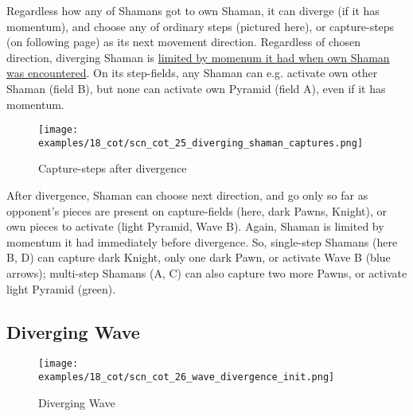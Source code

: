 \vspace*{-0.4\baselineskip}
Regardless how any of Shamans got to own Shaman, it can diverge (if it has momentum),
and choose any of ordinary steps (pictured here), or capture-steps (on following page)
as its next movement direction. Regardless of chosen direction, diverging Shaman is
\hyperref[fig:scn_cot_10_own_shaman_is_divergent_end]{limited by momenum it had when own Shaman was encountered}. \newline
\indent
On its step-fields, any Shaman can e.g. activate own other Shaman (field B), but none
can activate own Pyramid (field A), even if it has momentum.

\clearpage %

\vspace*{-2.1\baselineskip}
\noindent
\begin{figure}[!h]
\texttt{[image: examples/18\_cot/scn\_cot\_25\_diverging\_shaman\_captures.png]}
\vspace*{-1.3\baselineskip}
\caption{Capture-steps after divergence}
\label{fig:scn_cot_25_diverging_shaman_captures}
\end{figure}

\vspace*{-0.4\baselineskip}
After divergence, Shaman can choose next direction, and go only so far as opponent's
pieces are present on capture-fields (here, dark Pawns, Knight), or own pieces to
activate (light Pyramid, Wave B).  \newline
\indent
Again, Shaman is limited by momentum it had immediately before divergence. So,
single-step Shamans (here B, D) can capture dark Knight, only one dark Pawn, or
activate Wave B (blue arrows); multi-step Shamans (A, C) can also capture two
more Pawns, or activate light Pyramid (green).

\clearpage %

\subsection*{Diverging Wave}
\label{sec:Conquest of Tlalocan/Divergence/Diverging Wave}

\vspace*{-1.4\baselineskip}
\noindent
\begin{figure}[!h]
\texttt{[image: examples/18\_cot/scn\_cot\_26\_wave\_divergence\_init.png]}
\vspace*{-1.3\baselineskip}
\caption{Diverging Wave}
\label{fig:scn_cot_26_wave_divergence_init}
\end{figure}

